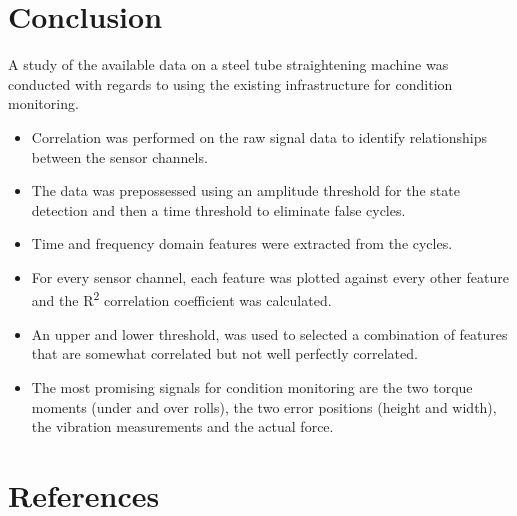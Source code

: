 \documentclass[]{article}
\begin{document}
\section{Conclusion}
A study of the available data on a steel tube straightening machine was conducted with regards to using the existing infrastructure for condition monitoring.
\begin{itemize}
\item Correlation was performed on the raw signal data to identify relationships between the sensor channels.
\item The data was prepossessed using an amplitude threshold for the state detection and then a time threshold to eliminate false cycles.
\item Time and frequency domain features were extracted from the cycles.
\item For every sensor channel, each feature was plotted against every other feature and the R\textsuperscript{2} correlation coefficient was calculated.
\item An upper and lower threshold, was used to selected a combination of features that are somewhat correlated but not well perfectly correlated.
\item The most promising signals for condition monitoring are the two torque moments (under and over rolls), the two error positions (height and width), the vibration measurements and the actual force.
\end{itemize}
\newpage

\section{References} 
\printbibliography[heading=none] 
\clearpage  
\end{document}
